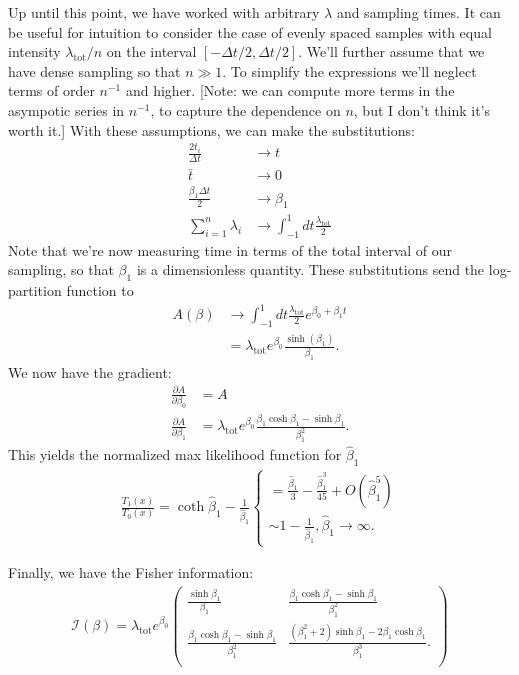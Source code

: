 \documentclass[12pt, letterpaper]{article}
\newcommand{ \lambtot }{\lambda_{\text{tot}}}
\begin{document}
Up until this point, we have worked with arbitrary $\lambda$ and sampling times.
It can be useful for intuition to consider the case of evenly spaced samples with equal intensity $\lambtot / n$ on the interval $[-\Delta t / 2, \Delta t / 2]$.
We'll further assume that we have dense sampling so that $n \gg 1$.
To simplify the expressions we'll neglect terms of order $n^{-1}$ and higher.
[Note: we can compute more terms in the asympotic series in $n^{-1}$, to capture the dependence on $n$, but I don't think it's worth it.]
With these assumptions, we can make the substitutions:
\begin{align}
    \frac{2 t_i}{\Delta t} & \to t \\
    \bar{t} & \to 0 \\
    \frac{\beta_1 \Delta t}{2} & \to \beta_1 \\
    \sum_{i=1}^{n} \lambda_i & \to \int_{-1}^{1} dt \frac{\lambtot}{2}
\end{align}
Note that we're now measuring time in terms of the total interval of our sampling, so that $\beta_1$ is a dimensionless quantity.
These substitutions send the log-partition function to
\begin{align}
    A(\beta) & \to \int_{-1}^{1} dt \frac{\lambtot}{2} e^{\beta_0 + \beta_1 t} \\
             & = \lambtot e^{\beta_0} \frac{\sinh(\beta_1)}{\beta_1}.
\end{align}
We now have the gradient:
\begin{align}
    \frac{\partial A}{\partial \beta_0} & = A \\
    \frac{\partial A}{\partial \beta_1} & = \lambtot e^{\beta_0} \frac{\beta_1 \cosh \beta_1 - \sinh \beta_1}{\beta_1^2}.
\end{align}
This yields the normalized max likelihood function for $\hat{\beta}_1$
\begin{align}
    \frac{T_1(x)}{T_0(x)} = \coth \hat{\beta}_1 - \frac{1}{\hat{\beta}_1}
    \begin{cases}
        = \frac{\hat{\beta}_1}{3} - \frac{\hat{\beta}_1^3}{45} + O(\hat{\beta}_1^5) \\
        \sim 1 - \frac{1}{\hat{\beta}_1}, \hat{\beta}_1 \to \infty.
    \end{cases}
\end{align}

Finally, we have the Fisher information:
\begin{align}
    \mathcal{I}(\beta) = \lambtot e^{\beta_0}
    \begin{pmatrix}
        \frac{\sinh \beta_1}{\beta_1} & \frac{\beta_1 \cosh \beta_1 - \sinh \beta_1}{\beta_1^2} \\
        \frac{\beta_1 \cosh \beta_1 - \sinh \beta_1}{\beta_1^2} &
        \frac{(\beta_1^2 + 2) \sinh \beta_1 - 2 \beta_1 \cosh \beta_1}{\beta_1^3}. \\
    \end{pmatrix}
\end{align}
\end{document}

